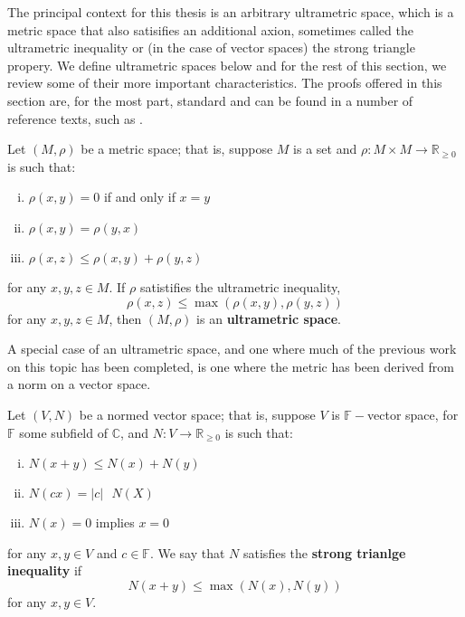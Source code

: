 
The principal context for this thesis is an arbitrary ultrametric space, which is a metric space that also satisifies an additional axion, sometimes called the ultrametric inequality or (in the case of vector spaces) the strong triangle propery. We define  ultrametric spaces below and for the rest of this section, we review some of their more important characteristics. The proofs offered in this section are, for the most part, standard and can be found in a number of reference texts, such as \cite{ar}.\\

\begin{definition}
	 Let $(M, \rho)$ be a metric space; that is, suppose $M$ is a set and $\rho: M \times M \rightarrow \mathbb{R}_{\geq 0}$ is such that:
	\begin{enumerate}[(i)]
		\item $\rho(x,y) = 0$ if and only if $x=y$
		\item $\rho(x,y) = \rho(y,x)$
		\item $\rho(x,z) \leq \rho(x,y) + \rho(y,z)$
	\end{enumerate}
	for any $x,y,z \in M$. If $\rho$ satistifies the ultrametric inequality,	
		\[ \rho(x,z) \leq \max{(\rho(x,y), \rho(y,z))}\]
for any $x,y,z \in M$, then $(M, \rho)$ is an \textbf{ultrametric space}.
\end{definition}

A special case of an ultrametric space, and one where much of the previous work on this topic has been completed, is one where the metric has been derived from a norm on a vector space. \\

\begin{definition}
	 Let $(V, N)$ be a normed vector space; that is, suppose $V$ is $\mathbb{F-}$vector space, for $\mathbb{F}$ some subfield of $\mathbb{C}$, and $N: V \rightarrow \mathbb{R}_{\geq 0}$  is such that:
	\begin{enumerate}[(i)]
		\item $N(x +y ) \leq N(x) + N(y)$
		\item $N(cx) = \lvert c \rvert \text{ } N(X)$
		\item $N(x) = 0$ implies $x=0$
	\end{enumerate}
	for any $x,y \in V$ and $c \in \mathbb{F}$. We say that $N$ satisfies the \textbf{strong trianlge inequality} if
	\[ N(x + y) \leq \max(N(x), N(y)) \]
	for any $x,y \in V$.
\end{definition}


